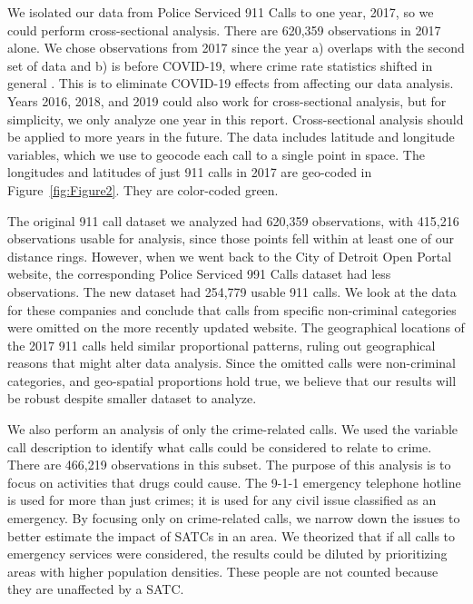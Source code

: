 \documentclass[12pt]{article}
\begin{document}
We isolated our data from Police Serviced 911 Calls to one year, 2017, so we could perform cross-sectional analysis. There are 620,359 observations in 2017 alone. We chose observations from 2017 since the year a) overlaps with the second set of data and b) is before COVID-19, where crime rate statistics shifted in general \citealp{covid_and_crime}. This is to eliminate COVID-19 effects from affecting our data analysis. Years 2016, 2018, and 2019 could also work for cross-sectional analysis, but for simplicity, we only analyze one year in this report. Cross-sectional analysis should be applied to more years in the future. The data includes latitude and longitude variables, which we use to geocode each call to a single point in space. The longitudes and latitudes of just 911 calls in 2017 are geo-coded in Figure~\ref{fig:Figure2}. They are color-coded green. 

The original 911 call dataset we analyzed had 620,359 observations, with 415,216 observations usable for analysis, since those points fell within at least one of our distance rings. However, when we went back to the City of Detroit Open Portal website, the corresponding Police Serviced 991 Calls dataset had less observations. The new dataset had 254,779 usable 911 calls.  We look at the data for these companies and conclude that calls from specific non-criminal categories were omitted on the more recently updated website. The geographical locations of the 2017 911 calls held similar proportional patterns, ruling out geographical reasons that might alter data analysis. Since the omitted calls were non-criminal categories, and geo-spatial proportions hold true, we believe that our results will be robust despite smaller dataset to analyze. 

We also perform an analysis of only the crime-related calls. We used the variable call description to identify what calls could be considered to relate to crime. There are 466,219 observations in this subset. The purpose of this analysis is to focus on activities that drugs could cause. The 9-1-1 emergency telephone hotline is used for more than just crimes; it is used for any civil issue classified as an emergency. By focusing only on crime-related calls, we narrow down the issues to better estimate the impact of SATCs in an area. We theorized that if all calls to emergency services were considered, the results could be diluted by prioritizing areas with higher population densities. These people are not counted because they are unaffected by a SATC.
\end{document}
